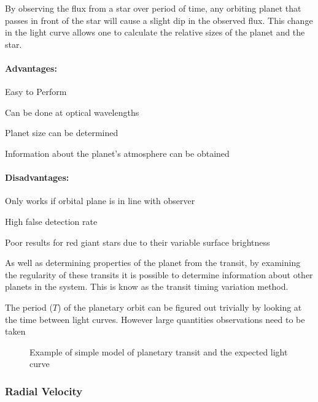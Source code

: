 By observing the flux from a star over period of time, any orbiting planet that passes in front of the star will cause a slight dip in the observed flux. This change in the light curve allows one to calculate the relative sizes of the planet and the star.


\paragraph{Advantages:}
\begin{itemize*}
    \item Easy to Perform
    \item Can be done at optical wavelengths
    \item Planet size can be determined
    \item Information about the planet's atmosphere can be obtained \citep{fortney2006atmosphere}
\end{itemize*}

\paragraph{Disadvantages:}
\begin{itemize*}
    \item Only works if orbital plane is in line with observer
    \item High false detection rate \citep{santerne2012sophie}
    \item Poor results for red giant stars due to their variable surface brightness
\end{itemize*}

As well as determining properties of the planet from the transit, by examining the regularity of these transits it is possible to determine information about other planets in the system. This is know as the transit timing variation method.

The period ($T$) of the planetary orbit can be figured out trivially by looking at the time between light curves. However large quantities observations need to be taken 

\begin{figure}
    \centering
    \def\svgwidth{\columnwidth}
    
    \caption{Example of simple model of planetary transit and the expected light curve}
    \label{fig:transit}
\end{figure}

\subsubsection{Radial Velocity}

